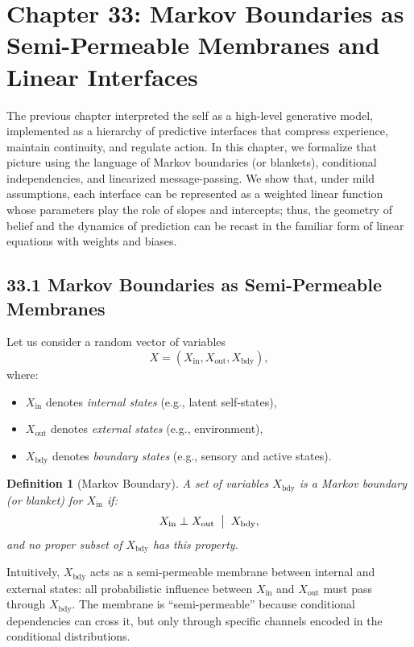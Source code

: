 \documentclass[12pt,letterpaper]{article}
\newtheorem{definition}[theorem]{Definition}
\theoremstyle{remark}
\begin{document}
\newpage
\section{Chapter 33: Markov Boundaries as Semi-Permeable Membranes and Linear Interfaces}

The previous chapter interpreted the self as a high-level generative model, implemented as a hierarchy of predictive interfaces that compress experience, maintain continuity, and regulate action. In this chapter, we formalize that picture using the language of Markov boundaries (or blankets), conditional independencies, and linearized message-passing. We show that, under mild assumptions, each interface can be represented as a weighted linear function whose parameters play the role of slopes and intercepts; thus, the geometry of belief and the dynamics of prediction can be recast in the familiar form of linear equations with weights and biases.

\subsection{33.1 Markov Boundaries as Semi-Permeable Membranes}

Let us consider a random vector of variables
\[
X = (X_{\text{in}}, X_{\text{out}}, X_{\text{bdy}}),
\]
where:

\begin{itemize}
  \item $X_{\text{in}}$ denotes \emph{internal states} (e.g., latent self-states),
  \item $X_{\text{out}}$ denotes \emph{external states} (e.g., environment),
  \item $X_{\text{bdy}}$ denotes \emph{boundary states} (e.g., sensory and active states).
\end{itemize}

\begin{definition}[Markov Boundary]
A set of variables $X_{\text{bdy}}$ is a \emph{Markov boundary} (or blanket) for $X_{\text{in}}$ if:
\[
X_{\text{in}} \perp X_{\text{out}} \;\bigm|\; X_{\text{bdy}},
\]
and no proper subset of $X_{\text{bdy}}$ has this property.
\end{definition}

Intuitively, $X_{\text{bdy}}$ acts as a semi-permeable membrane between internal and external states: all probabilistic influence between $X_{\text{in}}$ and $X_{\text{out}}$ must pass through $X_{\text{bdy}}$. The membrane is ``semi-permeable'' because conditional dependencies can cross it, but only through specific channels encoded in the conditional distributions.
\end{document}
